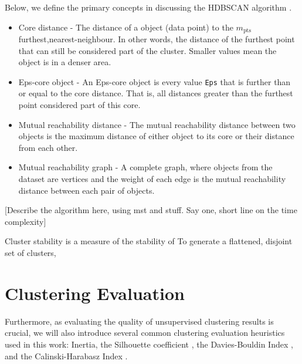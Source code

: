 \documentclass[10pt,oneside]{report}
\begin{document}
Below, we define the primary concepts in discussing the HDBSCAN algorithm \cite{campello2013density}. 
\begin{itemize}
    \item Core distance - The distance of a object (data point) to the $m_{\text{pts}}$ furthest,nearest-neighbour. In other words, the distance of the furthest point that can still be considered part of the cluster. Smaller values mean the object is in a denser area.
    \item Eps-core object - An Eps-core object is every value \texttt{Eps} that is further than or equal to the core distance. That is, all distances greater than the furthest point considered part of this core.
    \item Mutual reachability distance - The mutual reachability distance between two objects is the maximum distance of either object to its core or their distance from each other.
    \item Mutual reachability graph - A complete graph, where objects from the dataset are vertices and the weight of each edge is the mutual reachability distance between each pair of objects. 
\end{itemize}

[Describe the algorithm here, using mst and stuff. Say one, short line on the time complexity]

Cluster stability is a measure of the stability of To generate a flattened, disjoint set of clusters, 




\section{Clustering Evaluation}\label{sec:clusteringEval}
Furthermore, as evaluating the quality of unsupervised clustering results is crucial, we will also introduce several common clustering evaluation heuristics used in this work: Inertia, the Silhouette coefficient \cite{rousseeuw1987silhouettes}, the Davies-Bouldin Index \cite{davies1979cluster}, and the Calinski-Harabasz Index \cite{calinski1974dendrite}.
\end{document}
